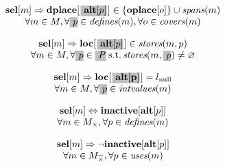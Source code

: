 \begin{equation}
  \begin{array}{c}
    \mVar{sel}[m]
    \mImp
    \mVar{dplace}[\hlDiff{\mVar{alt}[p]}[1pt]] \in
      \mSet{\mVar{oplace}[o]} \cup \mSpans(m) \\
    \forall m \in \mMatchSet,
    \forall \hlDiff{p} \in \mDefines(m),
    \forall o \in \mCovers(m)
  \end{array}
  \labelEquation{spanning-alt}
\end{equation}

\begin{equation}
  \begin{array}{c}
    \mVar{sel}[m]
    \mImp
    \mVar{loc}[\hlDiff{\mVar{alt}[p]}[1pt]] \in \mStores(m, p) \\
    \forall m \in \mMatchSet,
    \forall \hlDiff{p} \in
      \hlDiff{\mOperandSet} \;\text{s.t.}
      \mStores(m, \hlDiff{p}) \neq \mEmptySet
  \end{array}
  \labelEquation{valid-locations-alt}
\end{equation}

\begin{equation}
  \begin{array}{c}
    \mVar{sel}[m]
    \mImp
    \mVar{loc}[\hlDiff{\mVar{alt[p]}}[1pt]] = \mNullLocation \\
    \forall m \in \mMatchSet,
    \forall \hlDiff{p} \in \mIntValues(m)
  \end{array}
  \labelEquation{locs-of-intermediate-values-alt}
\end{equation}

\begin{equation}
  \begin{array}{c}
    \mVar{sel}[m]
    \mEq
    \mVar{inactive}[\mVar{alt}[p]] \\
    \forall m \in \mMatchSet[\mKill],
    \forall p \in \mDefines(m)
  \end{array}
  \labelEquation{inactivity-when-killed}
\end{equation}

\begin{equation}
  \begin{array}{c}
    \mVar{sel}[m]
    \mImp
    \neg \mVar{inactive}[\mVar{alt}[p]] \\
    \forall m \in \mMatchCompSet{\mKill},
    \forall p \in \mUses(m)
  \end{array}
  \labelEquation{inactivity-when-used}
\end{equation}

